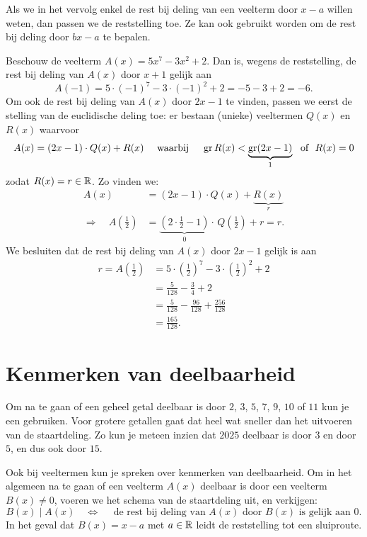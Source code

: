 \documentclass{ximera}
\begin{document}
Als we in het vervolg enkel de rest bij deling van een veelterm door $x-a$ willen weten, dan passen we de reststelling toe. Ze kan ook gebruikt worden om de rest bij deling door $bx-a$ te bepalen. 

\begin{voorbeeld}
Beschouw de veelterm $A(x) = 5x^7 - 3x^2 + 2$. Dan is, wegens de reststelling, de rest bij deling van $A(x)$ door $x+1$ gelijk aan
\[
A(-1) = 5 \cdot (-1)^7 - 3 \cdot (-1)^2 + 2 = -5-3+2 = -6.
\]
Om ook de rest bij deling van $A(x)$ door $2x-1$ te vinden, passen we eerst de stelling van de euclidische deling toe: er bestaan (unieke) veeltermen $Q(x)$ en $R(x)$ waarvoor
\[
A(x) = (2x-1)\cdot Q(x) + R(x) \quad \text{ waarbij } \quad \operatorname{gr} R(x) < \underbrace{\operatorname{gr} (2x-1)}_{1} \,\, \text{ of } \,\, R(x) = 0
\]
zodat $R(x) = r \in \mathbb{R}$. Zo vinden we:
\begin{align*}
A(x) & = (2x-1) \cdot Q(x) + \underbrace{R(x)}_{r} \\
\Rightarrow \quad A\left(\frac{1}{2}\right) & = \underbrace{\left(2 \cdot \frac{1}{2}-1\right)}_{0} \cdot \,Q\left(\frac{1}{2}\right) + r = r. 
\end{align*} 
We besluiten dat de rest bij deling van $A(x)$ door $2x-1$ gelijk is aan
\begin{align*}
r = A\left(\frac{1}{2}\right) & = 5 \cdot \left(\frac{1}{2}\right)^7 - 3 \cdot \left(\frac{1}{2}\right)^2 + 2 \\
& = \frac{5}{128} - \frac{3}{4} + 2 \\
& = \frac{5}{128} - \frac{96}{128} + \frac{256}{128} \\
& = \frac{165}{128}.
\end{align*}
\end{voorbeeld}

\section{Kenmerken van deelbaarheid} 

Om na te gaan of een geheel getal deelbaar is door $2$, $3$, $5$, $7$, $9$, $10$ of $11$ kun je een  gebruiken. Voor grotere getallen gaat dat heel wat sneller dan het uitvoeren van de staartdeling. Zo kun je meteen inzien dat $2025$ deelbaar is door $3$ en door $5$, en dus ook door $15$.  

Ook bij veeltermen kun je spreken over kenmerken van deelbaarheid. Om in het algemeen na te gaan of een veelterm $A(x)$ deelbaar is door een veelterm $B(x) \neq 0$, voeren we het schema van de staartdeling uit, en verkijgen:
\[
B(x) \mid A(x) \quad \Leftrightarrow \quad \text{ de rest bij deling van $A(x)$ door $B(x)$ is gelijk aan $0$.}
\] 
In het geval dat $B(x) = x-a$ met $a \in \mathbb{R}$ leidt de reststelling tot een sluiproute.
\end{document}
